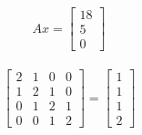 \documentclass[paper=a4, fontsize=10pt]{scrartcl} %
\begin{document}
	\begin{align}
		Ax =
		\begin{bmatrix}
			18 \\ 5 \\ 0
		\end{bmatrix}
	\end{align}

	\begin{align*}
		\begin{bmatrix}
			2 & 1 & 0 & 0 \\
			1 & 2 & 1 & 0 \\
			0 & 1 & 2 & 1 \\
			0 & 0 & 1 & 2
		\end{bmatrix}
		=
		\begin{bmatrix}
			1 \\
			1 \\
			1 \\
			2
		\end{bmatrix}
	\end{align*}
\end{document}
